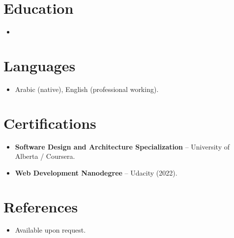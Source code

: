 \documentclass[11pt,a4paper,sans]{moderncv}
\begin{document}

\section{Education}
\vspace{1pt}
\begin{itemize}

\item{}

\end{itemize}


\section{Languages}
\vspace{1pt}
\begin{itemize}
\item Arabic (native), English (professional working).
\end{itemize}


\section{Certifications}
\vspace{1pt}
\begin{itemize}
\item{\textbf{Software Design and Architecture Specialization} -- University of Alberta / Coursera.}
\item{\textbf{Web Development Nanodegree} -- Udacity (2022).}
\end{itemize}


\section{References}
\vspace{1pt}
\begin{itemize}
\item{Available upon request.}
\end{itemize}
\end{document}
